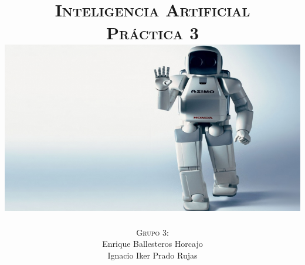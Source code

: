 \documentclass[11pt, a4paper, spanish, openright, twoside]{book}
\begin{document}
 
\title{\Huge{\textsc{Inteligencia Artificial}} \\
	\vspace{0.7cm}
	 \textsc{\Large{Práctica 3}} \\
	\vspace{1.5cm}
	\includegraphics[scale=0.45]{robotHonda}}
\author{\textsc{Grupo 3:}\\
	Enrique Ballesteros Horcajo\\
	Ignacio Iker Prado Rujas}
\date{\Today}
\maketitle

\newpage
\mbox{}
\thispagestyle{empty}						%
\newpage


\tableofcontents 							%

\newpage
\mbox{}
\thispagestyle{empty}						%
\newpage


\vspace{3cm}


\newpage
\end{document}

